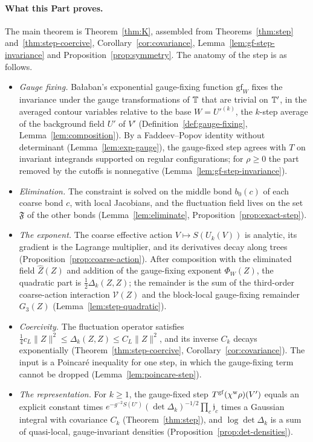 \paragraph{What this Part proves.} The main theorem is Theorem~\ref{thm:K}, assembled from Theorems~\ref{thm:step} and~\ref{thm:step-coercive}, Corollary~\ref{cor:covariance}, Lemma~\ref{lem:gf-step-invariance} and Proposition~\ref{prop:symmetry}. The anatomy of the step is as follows.
\begin{itemize}
\item \emph{Gauge fixing.} Ba\l aban's exponential gauge-fixing function $\mathrm{gf}_W$ fixes the invariance under the gauge transformations of $\mathbb T$ that are trivial on $\mathbb T'$, in the averaged contour variables relative to the base $W=U'^{(k)}$, the $k$-step average of the background field $U'$ of $V'$ (Definition~\ref{def:gauge-fixing}, Lemma~\ref{lem:composition}). By a Faddeev--Popov identity without determinant (Lemma~\ref{lem:exp-gauge}), the gauge-fixed step agrees with $T$ on invariant integrands supported on regular configurations; for $\rho\ge0$ the part removed by the cutoffs is nonnegative (Lemma~\ref{lem:gf-step-invariance}).
\item \emph{Elimination.} The constraint is solved on the middle bond $b_0(c)$ of each coarse bond $c$, with local Jacobians, and the fluctuation field lives on the set $\mathfrak F$ of the other bonds (Lemma~\ref{lem:eliminate}, Proposition~\ref{prop:exact-step}).
\item \emph{The exponent.} The coarse effective action $V\mapsto S(U_k(V))$ is analytic, its gradient is the Lagrange multiplier, and its derivatives decay along trees (Proposition~\ref{prop:coarse-action}). After composition with the eliminated field $\hat Z(Z)$ and addition of the gauge-fixing exponent $\Phi_W(Z)$, the quadratic part is $\frac12\Delta_k(Z,Z)$; the remainder is the sum of the third-order coarse-action interaction $\mathcal V(Z)$ and the block-local gauge-fixing remainder $G_3(Z)$ (Lemma~\ref{lem:step-quadratic}).
\item \emph{Coercivity.} The fluctuation operator satisfies $\frac14c_L\|Z\|^2\le\Delta_k(Z,Z)\le C_L\|Z\|^2$, and its inverse $C_k$ decays exponentially (Theorem~\ref{thm:step-coercive}, Corollary~\ref{cor:covariance}). The input is a Poincar\'e inequality for one step, in which the gauge-fixing term cannot be dropped (Lemma~\ref{lem:poincare-step}).
\item \emph{The representation.} For $k\ge1$, the gauge-fixed step $T^{\rm gf}(\chi^{\rm w}\rho)(V')$ equals an explicit constant times $e^{-g^{-2}S(U')}(\det\Delta_k)^{-1/2}\prod_c\mathfrak j_c$ times a Gaussian integral with covariance $C_k$ (Theorem~\ref{thm:step}), and $\log\det\Delta_k$ is a sum of quasi-local, gauge-invariant densities (Proposition~\ref{prop:det-densities}).
\end{itemize}
